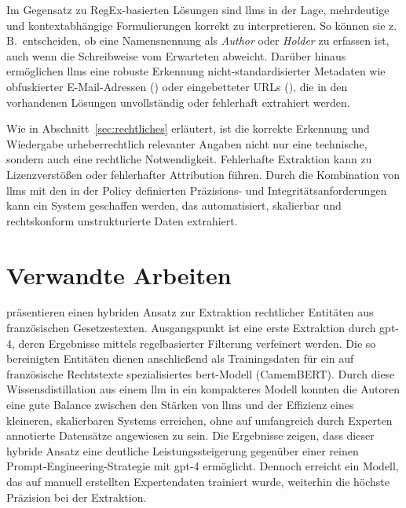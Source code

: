 Im Gegensatz zu RegEx-basierten Lösungen sind \glspl{llm} in der Lage, mehrdeutige und kontextabhängige Formulierungen korrekt zu interpretieren.
So können sie z.\,B.\ entscheiden, ob eine Namensnennung als \textit{Author} oder \textit{Holder} zu erfassen ist, auch wenn die Schreibweise vom Erwarteten abweicht.
Darüber hinaus ermöglichen \glspl{llm} eine robuste Erkennung nicht-standardisierter Metadaten wie obfuskierter E-Mail-Adressen () oder eingebetteter URLs (), die in den vorhandenen Lösungen unvollständig oder fehlerhaft extrahiert werden.

Wie in Abschnitt~\ref{sec:rechtliches} erläutert, ist die korrekte Erkennung und Wiedergabe urheberrechtlich relevanter Angaben nicht nur eine technische, sondern auch eine rechtliche Notwendigkeit.
Fehlerhafte Extraktion kann zu Lizenzverstößen oder fehlerhafter Attribution führen.
Durch die Kombination von \glspl{llm} mit den in der Policy definierten Präzisions- und Integritätsanforderungen kann ein System geschaffen werden, das automatisiert, skalierbar und rechtskonform unstrukturierte Daten extrahiert.


\section{Verwandte Arbeiten}\label{sec:verwandte-arbeiten}

\citeauthor{breton_empowering_2024}\autocite{breton_empowering_2024} präsentieren einen hybriden Ansatz zur Extraktion rechtlicher Entitäten aus französischen Gesetzestexten.
Ausgangspunkt ist eine erste Extraktion durch \gls{gpt}-4, deren Ergebnisse mittels regelbasierter Filterung verfeinert werden.
Die so bereinigten Entitäten dienen anschließend als Trainingsdaten für ein auf französische Rechtstexte spezialisiertes \gls{bert}-Modell (CamemBERT). Durch diese Wissensdistillation aus einem \gls{llm} in ein kompakteres Modell konnten die Autoren eine gute Balance zwischen den Stärken von \glspl{llm} und der Effizienz eines kleineren, skalierbaren Systems erreichen, ohne auf umfangreich durch Experten annotierte Datensätze angewiesen zu sein.
Die Ergebnisse zeigen, dass dieser hybride Ansatz eine deutliche Leistungssteigerung gegenüber einer reinen Prompt-Engineering-Strategie mit \gls{gpt}-4 ermöglicht.
Dennoch erreicht ein Modell, das auf manuell erstellten Expertendaten trainiert wurde, weiterhin die höchste Präzision bei der Extraktion\autocite{breton_empowering_2024}.

